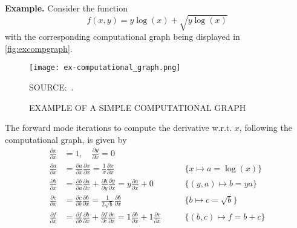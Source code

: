 \noindent\textbf{Example.}\hspace{.5cm}
Consider the function
\[
  f(x, y) = y\log(x) + \sqrt{y\log(x)}
\]
with the corresponding computational graph being displayed in
\autoref{fig:excompgraph}.

\begin{figure}[H]
  \setlength{\abovecaptionskip}{.0001pt}
  \caption{EXAMPLE OF A SIMPLE COMPUTATIONAL GRAPH}
  \vspace{0.425cm} \centering
  \texttt{[image: ex-computational\_graph.png]}
  \\
  \vspace{0.45cm}
  \begin{footnotesize}
    SOURCE:~.
  \end{footnotesize}
  \label{fig:excompgraph}
\end{figure}

The forward mode iterations to compute the derivative w.r.t. \(x\),
following the computational graph, is given by
\begin{align*}
  \frac{\partial x}{\partial x} &= 1, \quad
  \frac{\partial y}{\partial x} = 0\\
  \frac{\partial a}{\partial x} &=
  \frac{\partial a}{\partial x} \frac{\partial x}{\partial x} =
  \frac{1}{x} \frac{\partial x}{\partial x} \qquad
  &\{x \mapsto a = \log(x)\}\\
  \frac{\partial b}{\partial x} &=
  \frac{\partial b}{\partial a} \frac{\partial a}{\partial x} +
  \frac{\partial b}{\partial y} \frac{\partial y}{\partial x} =
  y \frac{\partial a}{\partial x} + 0 \qquad
  &\{(y, a) \mapsto b = ya\}\\
  \frac{\partial c}{\partial x} &=
  \frac{\partial c}{\partial b} \frac{\partial b}{\partial x} =
  \frac{1}{2\sqrt{b}} \frac{\partial b}{\partial x} \qquad
  &\{b \mapsto c = \sqrt{b}\}\\
  \frac{\partial f}{\partial x} &=
  \frac{\partial f}{\partial b} \frac{\partial b}{\partial x} +
  \frac{\partial f}{\partial c} \frac{\partial c}{\partial x} =
  1 \frac{\partial b}{\partial x} + 1 \frac{\partial c}{\partial x}
  \qquad &\{(b, c) \mapsto f = b + c\}
\end{align*}


